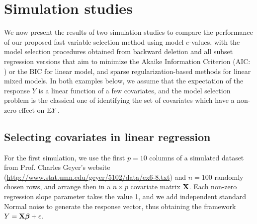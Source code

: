 \section{Simulation studies}
\label{Section:Simulation}
%
We now present the results of two simulation studies to compare the performance of our
proposed fast variable selection method using model $e$-values, with the model selection procedures obtained from backward deletion and all subset regression versions that aim to minimize the Akaike Information Criterion (AIC: \cite{Akaike70}) or the BIC for linear model, and sparse regularization-based methods for linear mixed models. In both examples below, we assume that the expectation of the response $Y$ is a linear function of a few covariates, and the model selection problem is the classical one of identifying the set of covariates which have a non-zero effect on ${\mathbb{E}} Y$.


\subsection{Selecting covariates in linear regression}

For the first simulation, we use the first $p = 10$ columns of a simulated dataset from Prof. Charles Geyer's website (\url{http://www.stat.umn.edu/geyer/5102/data/ex6-8.txt}) and $n = 100$ randomly chosen rows, and arrange then in a $n \times p$ covariate matrix ${\mathbf{X}}$. Each non-zero regression slope parameter takes the value 1, and we add independent standard Normal noise to generate the response vector, thus obtaining the 
framework $Y = {\mathbf{X}} {\boldsymbol{\beta}} + \epsilon$.

